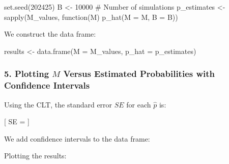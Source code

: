\documentclass[
  letterpaper,
  DIV=11,
  numbers=noendperiod]{scrartcl}
\newenvironment{Shaded}{\begin{snugshade}}{\end{snugshade}}
\newcommand{\AttributeTok}[1]{\textcolor[rgb]{0.98,0.46,0.51}{#1}}
\newcommand{\CommentTok}[1]{\textcolor[rgb]{0.42,0.45,0.49}{#1}}
\newcommand{\ControlFlowTok}[1]{\textcolor[rgb]{0.98,0.46,0.51}{#1}}
\newcommand{\DecValTok}[1]{\textcolor[rgb]{0.47,0.72,1.00}{#1}}
\newcommand{\FunctionTok}[1]{\textcolor[rgb]{0.70,0.57,0.94}{#1}}
\newcommand{\NormalTok}[1]{\textcolor[rgb]{0.88,0.89,0.91}{#1}}
\newcommand{\OtherTok}[1]{\textcolor[rgb]{0.70,0.57,0.94}{#1}}
\newcommand{\SpecialCharTok}[1]{\textcolor[rgb]{0.47,0.72,1.00}{#1}}
\begin{document}
\begin{Shaded}
\begin{Highlighting}[]
\FunctionTok{set.seed}\NormalTok{(}\DecValTok{202425}\NormalTok{)}
\NormalTok{B }\OtherTok{\textless{}{-}} \DecValTok{10000}  \CommentTok{\# Number of simulations}
\NormalTok{p\_estimates }\OtherTok{\textless{}{-}} \FunctionTok{sapply}\NormalTok{(M\_values, }\ControlFlowTok{function}\NormalTok{(M) }\FunctionTok{p\_hat}\NormalTok{(}\AttributeTok{M =}\NormalTok{ M, }\AttributeTok{B =}\NormalTok{ B))}
\end{Highlighting}
\end{Shaded}

We construct the data frame:

\begin{Shaded}
\begin{Highlighting}[]
\NormalTok{results }\OtherTok{\textless{}{-}} \FunctionTok{data.frame}\NormalTok{(}\AttributeTok{M =}\NormalTok{ M\_values, }\AttributeTok{p\_hat =}\NormalTok{ p\_estimates)}
\end{Highlighting}
\end{Shaded}

\subsubsection{\texorpdfstring{5. Plotting \(M\) Versus Estimated
Probabilities with Confidence
Intervals}{5. Plotting M Versus Estimated Probabilities with Confidence Intervals}}\label{plotting-m-versus-estimated-probabilities-with-confidence-intervals}

Using the CLT, the standard error \(SE\) for each \(\hat{p}\) is:

{[} SE =  {]}

We add confidence intervals to the data frame:

\begin{Shaded}
\end{Shaded}

Plotting the results:
\end{document}
